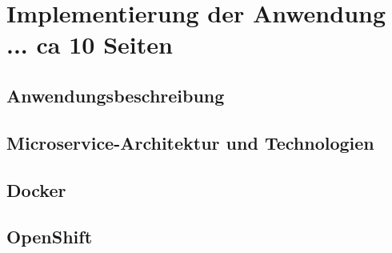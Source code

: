 \documentclass[master,german]{hgbthesis}
\begin{document}
\chapter{Implementierung der Anwendung ... ca 10 Seiten}
\section{Anwendungsbeschreibung}
\section{Microservice-Architektur und Technologien}
\section{Docker}
\section{OpenShift}



\end{document}
